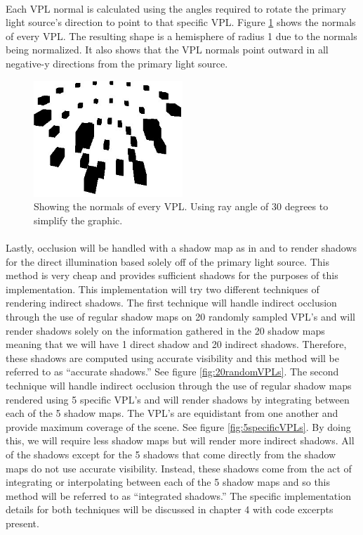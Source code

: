 \paragraph{}
Each VPL normal is calculated using the angles required to rotate the primary light source's direction to point to that specific VPL.  Figure \ref{fig:vplNormals} shows the normals of every VPL.  The resulting shape is a hemisphere of radius 1 due to the normals being normalized.  It also shows that the VPL normals point outward in all negative-y directions from the primary light source.

\begin{figure}[h!]
  \centering
    \includegraphics[width=0.5\textwidth]{vplNormals.jpg}
  	\caption{Showing the normals of every VPL. Using ray angle of 30 degrees to simplify the graphic.}
	\label{fig:vplNormals}
\end{figure}

\paragraph{}
Lastly, occlusion will be handled with a shadow map as in \cite{Williams1978} and \cite{Reeves1987} to render shadows for the direct illumination based solely off of the primary light source.  This method is very cheap and provides sufficient shadows for the purposes of this implementation.  This implementation will try two different techniques of rendering indirect shadows.  The first technique will handle indirect occlusion through the use of regular shadow maps on 20 randomly sampled VPL's and will render shadows solely on the information gathered in the 20 shadow maps meaning that we will have 1 direct shadow and 20 indirect shadows.  Therefore, these shadows are computed using accurate visibility and this method will be referred to as ``accurate shadows.''  See figure \ref{fig:20randomVPLs}.  The second technique will handle indirect occlusion through the use of regular shadow maps rendered using 5 specific VPL's and will render shadows by integrating between each of the 5 shadow maps.  The VPL's are equidistant from one another and provide maximum coverage of the scene.  See figure \ref{fig:5specificVPLs}.  By doing this, we will require less shadow maps but will render more indirect shadows.  All of the shadows except for the 5 shadows that come directly from the shadow maps do not use accurate visibility.  Instead, these shadows come from the act of integrating or interpolating between each of the 5 shadow maps and so this method will be referred to as ``integrated shadows.''  The specific implementation details for both techniques will be discussed in chapter 4 with code excerpts present.

